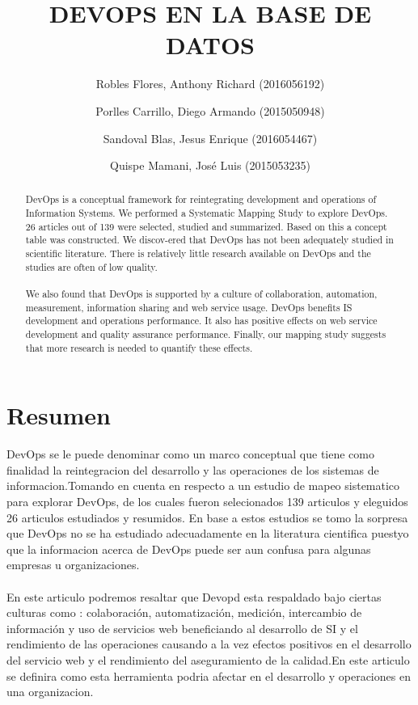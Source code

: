 \documentclass[preprint,12pt]{elsarticle}
\begin{document}
	
	\begin{frontmatter}

		\title{\huge  DEVOPS EN LA BASE DE DATOS}
		
		\author{Robles Flores, Anthony Richard	              (2016056192)}
		\author{Porlles Carrillo, Diego Armando              (2015050948)}
		\author{Sandoval Blas, Jesus Enrique           (2016054467)}
		\author{Quispe Mamani, José Luis              (2015053235)}
		
		\address{Tacna, Perú}
		
		\begin{abstract}
DevOps is a conceptual framework for reintegrating development and operations of Information Systems. We performed a Systematic Mapping Study to explore DevOps. 26 articles out of 139 were selected, studied and summarized. Based on this a concept table was constructed. We discov-ered that DevOps has not been adequately studied in scientific literature. There is relatively little research available on DevOps and the studies are often of low quality. 
\\
\\
We also found that DevOps is supported by a culture of collaboration, automation, measurement, information sharing and web service usage. DevOps benefits IS development and operations performance. It also has positive effects on web service development and quality assurance performance. Finally, our mapping study suggests that more research is needed to quantify these effects.
		\end{abstract}
\end{frontmatter}
	
	\section{Resumen}

DevOps se le puede denominar como un marco conceptual que tiene como finalidad la reintegracion del desarrollo y las operaciones de los sistemas de informacion.Tomando en cuenta en respecto a un estudio de mapeo sistematico para explorar DevOps,
de los cuales fueron selecionados 139 articulos y eleguidos 26 articulos estudiados y resumidos.
En base a estos estudios se tomo la sorpresa que DevOps no se ha estudiado adecuadamente en la literatura cientifica puestyo que la informacion acerca de DevOps puede ser aun confusa para algunas empresas u organizaciones.
\\
\\
En este articulo podremos resaltar que Devopd esta respaldado bajo ciertas culturas como :  colaboración, automatización, medición, intercambio de información y uso de servicios web beneficiando al desarrollo de SI y el rendimiento de las operaciones causando a la vez efectos positivos en el desarrollo del servicio web y el rendimiento del aseguramiento de la calidad.En este articulo se definira como esta herramienta podria afectar en el desarrollo y operaciones en una organizacion.
\end{document}
